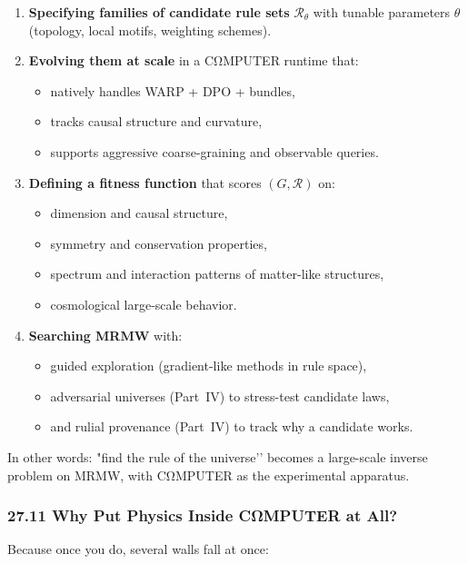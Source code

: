 \begin{enumerate}
  \item \textbf{Specifying families of candidate rule sets} $\mathcal{R}_\theta$ with tunable parameters $\theta$ (topology, local motifs, weighting schemes).

  \item \textbf{Evolving them at scale} in a CΩMPUTER runtime that:
    \begin{itemize}
      \item natively handles WARP + DPO + bundles,
      \item tracks causal structure and curvature,
      \item supports aggressive coarse-graining and observable queries.
    \end{itemize}

  \item \textbf{Defining a fitness function} that scores $(G,\mathcal{R})$ on:
    \begin{itemize}
      \item dimension and causal structure,
      \item symmetry and conservation properties,
      \item spectrum and interaction patterns of matter-like structures,
      \item cosmological large-scale behavior.
    \end{itemize}

  \item \textbf{Searching MRMW} with:
    \begin{itemize}
      \item guided exploration (gradient-like methods in rule space),
      \item adversarial universes (Part~IV) to stress-test candidate laws,
      \item and rulial provenance (Part~IV) to track why a candidate works.
    \end{itemize}
\end{enumerate}

In other words: "find the rule of the universe’’ becomes a large-scale inverse problem on MRMW, with CΩMPUTER as the experimental apparatus.

\subsubsection*{27.11  Why Put Physics Inside CΩMPUTER at All?}

Because once you do, several walls fall at once:

